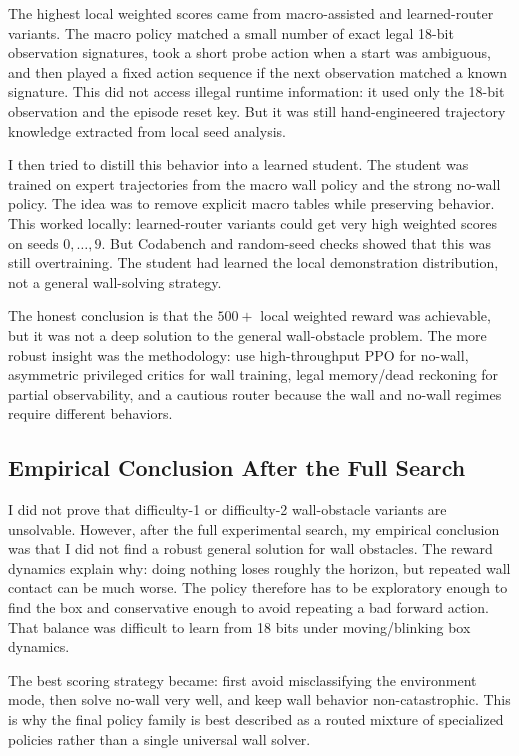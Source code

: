 \documentclass[11pt]{article}
\begin{document}
The highest local weighted scores came from macro-assisted and learned-router variants.
The macro policy matched a small number of exact legal 18-bit observation signatures,
took a short probe action when a start was ambiguous, and then played a fixed action
sequence if the next observation matched a known signature. This did not access illegal
runtime information: it used only the 18-bit observation and the episode reset key. But
it was still hand-engineered trajectory knowledge extracted from local seed analysis.

I then tried to distill this behavior into a learned student. The student was trained on
expert trajectories from the macro wall policy and the strong no-wall policy. The idea
was to remove explicit macro tables while preserving behavior. This worked locally:
learned-router variants could get very high weighted scores on seeds \(0,\ldots,9\).
But Codabench and random-seed checks showed that this was still overtraining. The
student had learned the local demonstration distribution, not a general wall-solving
strategy.

The honest conclusion is that the \(500+\) local weighted reward was achievable, but it
was not a deep solution to the general wall-obstacle problem. The more robust insight was
the methodology: use high-throughput PPO for no-wall, asymmetric privileged critics for
wall training, legal memory/dead reckoning for partial observability, and a cautious
router because the wall and no-wall regimes require different behaviors.

\subsection{Empirical Conclusion After the Full Search}

I did not prove that difficulty-1 or difficulty-2 wall-obstacle variants are unsolvable.
However, after the full experimental search, my empirical conclusion was that I did not
find a robust general solution for wall obstacles. The reward dynamics explain why:
doing nothing loses roughly the horizon, but repeated wall contact can be much worse.
The policy therefore has to be exploratory enough to find the box and conservative
enough to avoid repeating a bad forward action. That balance was difficult to learn from
18 bits under moving/blinking box dynamics.

The best scoring strategy became: first avoid misclassifying the environment mode, then
solve no-wall very well, and keep wall behavior non-catastrophic. This is why the final
policy family is best described as a routed mixture of specialized policies rather than
a single universal wall solver.
\end{document}
